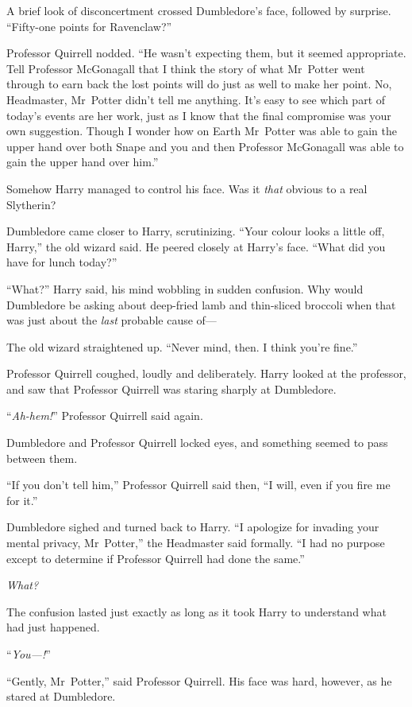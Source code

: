 A brief look of disconcertment crossed Dumbledore’s face, followed by surprise. “Fifty-one points for Ravenclaw?”

Professor Quirrell nodded. “He wasn’t expecting them, but it seemed appropriate. Tell Professor McGonagall that I think the story of what Mr~Potter went through to earn back the lost points will do just as well to make her point. No, Headmaster, Mr~Potter didn’t tell me anything. It’s easy to see which part of today’s events are her work, just as I know that the final compromise was your own suggestion. Though I wonder how on Earth Mr~Potter was able to gain the upper hand over both Snape and you and then Professor McGonagall was able to gain the upper hand over him.”

Somehow Harry managed to control his face. Was it \emph{that} obvious to a real Slytherin?

Dumbledore came closer to Harry, scrutinizing. “Your colour looks a little off, Harry,” the old wizard said. He peered closely at Harry’s face. “What did you have for lunch today?”

“What?” Harry said, his mind wobbling in sudden confusion. Why would Dumbledore be asking about deep-fried lamb and thin-sliced broccoli when that was just about the \emph{last} probable cause of—

The old wizard straightened up. “Never mind, then. I think you’re fine.”

Professor Quirrell coughed, loudly and deliberately. Harry looked at the professor, and saw that Professor Quirrell was staring sharply at Dumbledore.

“\emph{Ah-hem!}” Professor Quirrell said again.

Dumbledore and Professor Quirrell locked eyes, and something seemed to pass between them.

“If you don’t tell him,” Professor Quirrell said then, “I will, even if you fire me for it.”

Dumbledore sighed and turned back to Harry. “I apologize for invading your mental privacy, Mr~Potter,” the Headmaster said formally. “I had no purpose except to determine if Professor Quirrell had done the same.”

\emph{What?}

The confusion lasted just exactly as long as it took Harry to understand what had just happened.

“\emph{You—!}”

“Gently, Mr~Potter,” said Professor Quirrell. His face was hard, however, as he stared at Dumbledore.

